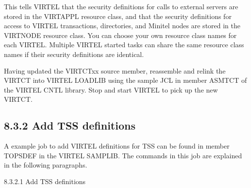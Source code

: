 \documentclass[letterpaper,10pt,english]{sphinxmanual}
\begin{document}
This tells VIRTEL that the security definitions for calls to external servers are stored in the VIRTAPPL resource class, and that the security definitions for access to VIRTEL transactions, directories, and Minitel nodes are stored in the VIRTNODE resource class. You can choose your own resource class names for each VIRTEL.  Multiple VIRTEL started tasks can share the same resource class names if their security definitions are identical.

Having updated the VIRTCTxx source member, reassemble and relink the VIRTCT into VIRTEL LOADLIB using the sample JCL in member ASMTCT of the VIRTEL CNTL library. Stop and start VIRTEL to pick up the new VIRTCT.


\subsection{8.3.2 Add TSS definitions}
\label{\detokenize{Installation_Guide:add-tss-definitions}}
A example job to add VIRTEL definitions for TSS can be found in member TOPSDEF in the VIRTEL SAMPLIB. The commands in this job are explained in the following paragraphs.

8.3.2.1 Add TSS definitions
\end{document}
